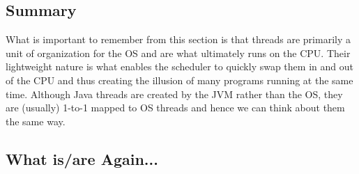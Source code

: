 \documentclass[main]{subfiles}
\begin{document}
\subsection{Summary}
What is important to remember from this section is that threads are primarily a unit of organization for the OS and are what ultimately runs on the CPU. Their lightweight nature is what enables the scheduler to quickly swap them in and out of the CPU and thus creating the illusion of many programs running at the same time. Although Java threads are created by the JVM rather than the OS, they are (usually) 1-to-1 mapped to OS threads and hence we can think about them the same way.

\subsection{What is/are Again...}
\end{document}
